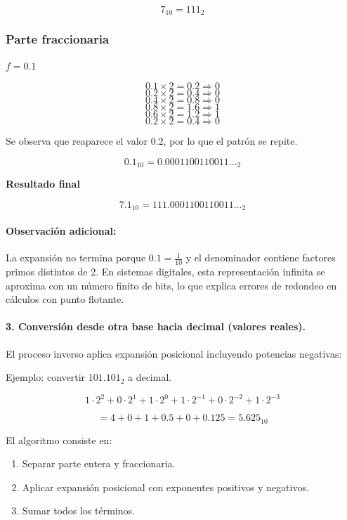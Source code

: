 \documentclass[12pt,twoside]{book}
\begin{document}
						\[
						7_{10} = 111_2
						\]
						
						\subsubsection*{Parte fraccionaria}
						
						\noindent
						$f = 0.1$
						
						\[
						0.1 \times 2 = 0.2 \Rightarrow 0
						\]
						\[
						0.2 \times 2 = 0.4 \Rightarrow 0
						\]
						\[
						0.4 \times 2 = 0.8 \Rightarrow 0
						\]
						\[
						0.8 \times 2 = 1.6 \Rightarrow 1
						\]
						\[
						0.6 \times 2 = 1.2 \Rightarrow 1
						\]
						\[
						0.2 \times 2 = 0.4 \Rightarrow 0
						\]
						
						\noindent
						Se observa que reaparece el valor 0.2, por lo que el patrón se repite.
						
						\[
						0.1_{10} = 0.0001100110011\ldots_2
						\]
						
						\noindent
						\textbf{Resultado final}
						
						\[
						7.1_{10} = 111.0001100110011\ldots_2
						\]
						
						\noindent
						\paragraph{Observación adicional:} La expansión no termina porque $0.1 = \frac{1}{10}$ y el denominador contiene factores primos distintos de 2. En sistemas digitales, esta representación infinita se aproxima con un número finito de bits, lo que explica errores de redondeo en cálculos con punto flotante.
						
						\paragraph{3. Conversión desde otra base hacia decimal (valores reales). } El proceso inverso aplica expansión posicional incluyendo potencias negativas:
						
						Ejemplo: convertir $101.101_2$ a decimal.
						
						\[
						1\cdot2^2 + 0\cdot2^1 + 1\cdot2^0 + 1\cdot2^{-1} + 0\cdot2^{-2} + 1\cdot2^{-3}
						\]
						
						\[
						= 4 + 0 + 1 + 0.5 + 0 + 0.125 = 5.625_{10}
						\]
						
						\noindent
						El algoritmo consiste en:
						\begin{enumerate}
							\item Separar parte entera y fraccionaria.
							\item Aplicar expansión posicional con exponentes positivos y negativos.
							\item Sumar todos los términos.
						\end{enumerate}
						
\end{document}
